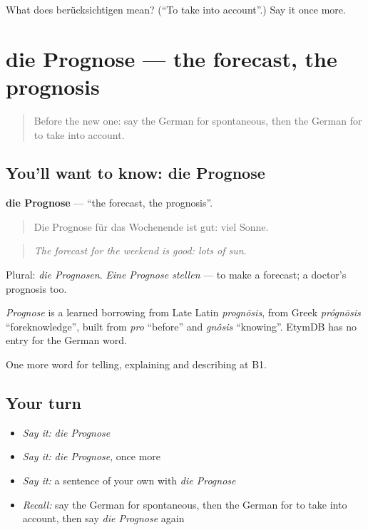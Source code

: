 \begin{tcolorbox}[breakable,colback=teal!4,colframe=teal!35!black,title={Before you move on}]
What does berücksichtigen mean? (\textquotedblleft{}To take into account\textquotedblright{}.) Say it once more.
\end{tcolorbox}
\section[die Prognose]{die Prognose — the forecast, the prognosis}

\label{lesson:GE-C373-prognose}



\begin{quote}
Before the new one: say the German for spontaneous, then the German for to take into account.
\end{quote}

\subsection*{You'll want to know: die Prognose}
\textbf{die Prognose} — \textquotedblleft{}the forecast, the prognosis\textquotedblright{}.

\begin{quote}
Die Prognose für das Wochenende ist gut: viel Sonne.
\end{quote}

\begin{quote}
\emph{The forecast for the weekend is good: lots of sun.}
\end{quote}

Plural: \emph{die Prognosen}. \emph{Eine Prognose stellen} — to make a forecast; a doctor's prognosis too.

\begin{cousinweb}
\emph{Prognose} is a learned borrowing from Late Latin \emph{prognōsis}, from Greek \emph{prógnōsis} \textquotedblleft{}foreknowledge\textquotedblright{}, built from \emph{pro} \textquotedblleft{}before\textquotedblright{} and \emph{gnôsis} \textquotedblleft{}knowing\textquotedblright{}. EtymDB has no entry for the German word.
\end{cousinweb}

\begin{grammarlens}[title={What you've built}]
One more word for telling, explaining and describing at B1.
\end{grammarlens}

\subsection*{Your turn}
\begin{itemize}
\raggedright
  \item \emph{Say it:} \emph{die Prognose}
  \item \emph{Say it:} \emph{die Prognose}, once more
  \item \emph{Say it:} a sentence of your own with \emph{die Prognose}
  \item \emph{Recall:} say the German for spontaneous, then the German for to take into account, then say \emph{die Prognose} again
\end{itemize}

